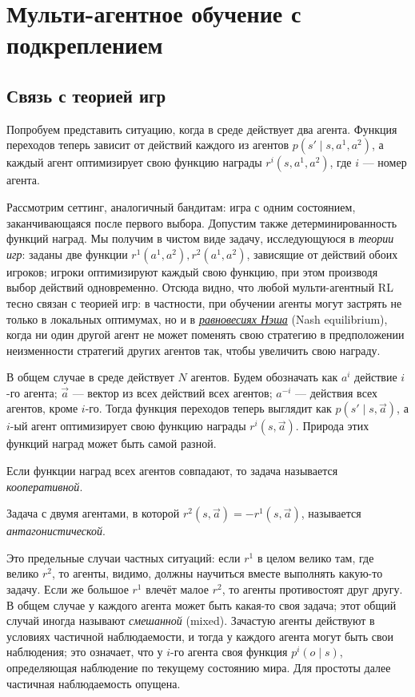\section{Мульти-агентное обучение с подкреплением}

\subsection{Связь с теорией игр}

Попробуем представить ситуацию, когда в среде действует два агента. Функция переходов теперь зависит от действий каждого из агентов $p(s' \mid s, a^1, a^2)$, а каждый агент оптимизирует свою функцию награды $r^i(s, a^1, a^2)$, где $i$ --- номер агента.

Рассмотрим сеттинг, аналогичный бандитам: игра с одним состоянием, заканчивающаяся после первого выбора. Допустим также детерминированность функций наград. Мы получим в чистом виде задачу, исследующуюся в \emph{теории игр}: заданы две функции $r^1(a^1, a^2), r^2(a^1, a^2)$, зависящие от действий обоих игроков; игроки оптимизируют каждый свою функцию, при этом производя выбор действий одновременно. Отсюда видно, что любой мульти-агентный RL тесно связан с теорией игр: в частности, при обучении агенты могут застрять не только в локальных оптимумах, но и в \href{https://ru.wikipedia.org/wiki/Равновесие_Нэша}{\emph{равновесиях Нэша}} (Nash equilibrium), когда ни один другой агент не может поменять свою стратегию в предположении неизменности стратегий других агентов так, чтобы увеличить свою награду.

В общем случае в среде действует $N$ агентов. Будем обозначать как $a^i$ действие $i$-го агента; $\vec{a}$ --- вектор из всех действий всех агентов; $a^{-i}$ --- действия всех агентов, кроме $i$-го. Тогда функция переходов теперь выглядит как $p(s' \mid s, \vec{a})$, а $i$-ый агент оптимизирует свою функцию награды $r^i(s, \vec{a})$. Природа этих функций наград может быть самой разной.

\begin{definition}
Если функции наград всех агентов совпадают, то задача называется \emph{кооперативной}.
\end{definition}

\begin{definition}
Задача с двумя агентами, в которой $r^2(s, \vec{a}) = -r^1(s, \vec{a})$, называется \emph{антагонистической}.
\end{definition}

Это предельные случаи частных ситуаций: если $r^1$ в целом велико там, где велико $r^2$, то агенты, видимо, должны научиться вместе выполнять какую-то задачу. Если же большое $r^1$ влечёт малое $r^2$, то агенты противостоят друг другу. В общем случае у каждого агента может быть какая-то своя задача; этот общий случай иногда называют \emph{смешанной} (mixed). Зачастую агенты действуют в условиях частичной наблюдаемости, и тогда у каждого агента могут быть свои наблюдения; это означает, что у $i$-го агента своя функция $p^i(o \mid s)$, определяющая наблюдение по текущему состоянию мира. Для простоты далее частичная наблюдаемость опущена. 

